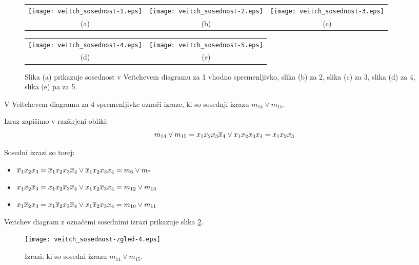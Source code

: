 \begin{figure}[ht]
\begin{center}
	\begin{tabular}{ccc}
		\texttt{[image: veitch\_sosednost-1.eps]} & \texttt{[image: veitch\_sosednost-2.eps]} & \texttt{[image: veitch\_sosednost-3.eps]}\\
		(a) & (b) & (c)\\
	\end{tabular}		
	\begin{tabular}{cc}
		\texttt{[image: veitch\_sosednost-4.eps]} & \texttt{[image: veitch\_sosednost-5.eps]}\\
		(d) & (e)\\
	\end{tabular}	
	
\end{center}
\caption{Slika (a) prikazuje sosednost v Veitchevem diagramu za 1 vhodno spremenljivko, slika (b) za 2, slika (c) za 3, slika (d) za 4, slika (e) pa za 5.}
\label{fig:Veitch_sosednost}
\end{figure}

\begin{zgled}
V Veitchevem diagramu za 4 spremenljivke označi izraze, ki so sosednji izrazu $m_{14} \vee m_{15}$.\\
\end{zgled}
\begin{resitev}
Izraz zapišimo v razširjeni obliki: 
$$ m_{14} \vee m_{15} = x_1 x_2 x_3 \overline x_4 \vee x_1 x_2 x_3 x_4 = x_1 x_2 x_3$$

Sosedni izrazi so torej:
\begin{itemize}
\item $\overline x_1 x_2 x_3 = \overline x_1 x_2 x_3 \overline x_4\vee \overline x_1 x_2 x_3 x_4 = m_{6} \vee m_7$ 
\item $x_1 x_2 \overline x_3 = x_1 x_2 \overline x_3 \overline x_4 \vee x_1 x_2 \overline x_3 x_4 = m_{12} \vee m_{13}$
\item $x_1 \overline x_2 x_3 = x_1 \overline x_2 x_3 \overline x_4 \vee x_1 \overline x_2 x_3 x_4= m_{10} \vee m_{11}$ 
\end{itemize}

Veitchev diagram z označemi sosednimi izrazi prikazuje slika \ref{fig:Veitch_sosednost_zgled_4}.

\begin{figure}[ht]
\begin{center}
	\texttt{[image: veitch\_sosednost-zgled-4.eps]}
\end{center}
\caption{Izrazi, ki so sosedni izrazu $m_{14} \vee m_{15}$.}
\label{fig:Veitch_sosednost_zgled_4}
\end{figure}

\end{resitev}

